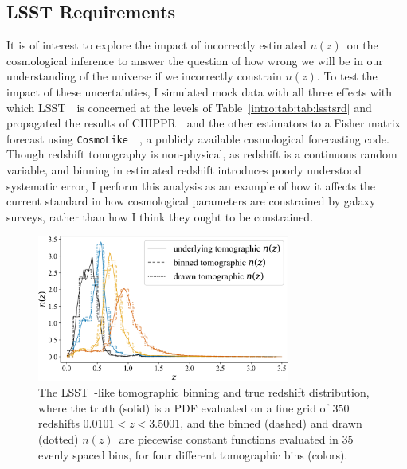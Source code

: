 \documentclass[iop]{emulateapj}
\newcommand{\project}[1]{{\textsc{#1}}~}
\newcommand{\lsst}{\project{LSST}}
\newcommand{\Chippr}{\project{CHIPPR}}
\newcommand{\repo}[1]{{\texttt{#1}}~}
\newcommand{\cosmolike}{\repo{CosmoLike}}
\newcommand{\nz}{$n(z)$}
\begin{document}
\subsection{LSST Requirements}
\label{sec:lsstdemo}

It is of interest to explore the impact of incorrectly estimated \nz\ on the 
cosmological inference to answer the question of how wrong we will be in our 
understanding of the universe if we incorrectly constrain \nz.
To test the impact of these uncertainties, I simulated mock data with all three 
effects with which \lsst\ is concerned at the levels of 
Table~\ref{intro:tab:tab:lsstsrd} and propagated the results of \Chippr\ and 
the other estimators to a Fisher matrix forecast using \cosmolike\ 
\citep{krause_cosmolike_2017}, a publicly available cosmological forecasting 
code.
Though redshift tomography is non-physical, as redshift is a continuous random 
variable, and binning in estimated redshift introduces poorly understood 
systematic error, I perform this analysis as an example of how it affects the 
current standard in how cosmological parameters are constrained by galaxy 
surveys, rather than how I think they ought to be constrained.

\begin{figure}
	\begin{center}
		
\includegraphics[width=0.74\textwidth]{figures/chippr/cosmolike_inputs.png}
		\caption{
			The \lsst-like tomographic binning and true redshift 
distribution, where the truth (solid) is a PDF evaluated on a fine grid of 
$350$ redshifts $0.0101 < z < 3.5001$, and the binned (dashed) and drawn 
(dotted) \nz\ are piecewise constant functions evaluated in $35$ evenly spaced 
bins, for four different tomographic bins (colors).
		}
		\label{fig:tomobins}
	\end{center}
\end{figure}
\end{document}
